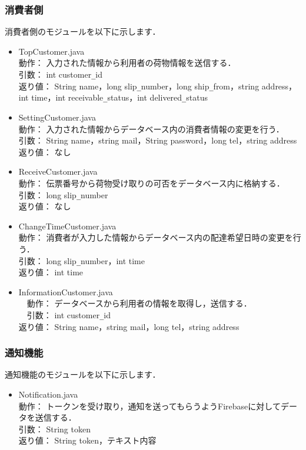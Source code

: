 \documentclass[a4j,titlepage]{jarticle}
\begin{document}
\subsubsection{消費者側}
消費者側のモジュールを以下に示します．
\begin{itemize}
\item TopCustomer.java\\
  動作： 入力された情報から利用者の荷物情報を送信する．\\
  引数： int customer\verb|_|id\\
  返り値： String name，long slip\verb|_|number，long ship\verb|_|from，string address，int time，int receivable\verb|_|status，int delivered\verb|_|status
\item SettingCustomer.java\\
  動作： 入力された情報からデータベース内の消費者情報の変更を行う．\\
  引数： String name，string mail，String password，long tel，string address\\
  返り値： なし
\item ReceiveCustomer.java\\
  動作： 伝票番号から荷物受け取りの可否をデータベース内に格納する．\\
  引数： long slip\verb|_|number\\
  返り値： なし
\item ChangeTimeCustomer.java\\
  動作： 消費者が入力した情報からデータベース内の配達希望日時の変更を行う．\\
  引数： long slip\verb|_|number，int time\\
  返り値： int time
  \item InformationCustomer.java\\
　動作： データベースから利用者の情報を取得し，送信する．\\
　引数： int customer\verb|_|id\\
返り値： String name，string mail，long tel，string address
\end{itemize}

\subsubsection{通知機能}
通知機能のモジュールを以下に示します．
\begin{itemize}
\item Notification.java\\
  動作： トークンを受け取り，通知を送ってもらうようFirebaseに対してデータを送信する．\\
  引数： String token\\
  返り値： String token，テキスト内容
\end{itemize}
\end{document}
